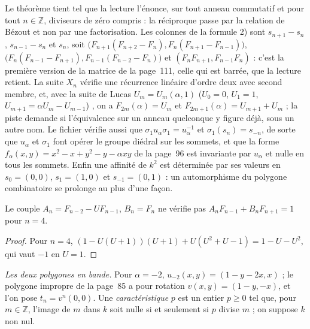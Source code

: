\begin{remarque}
Le théorème tient tel que la lecture l'énonce, sur tout anneau commutatif et pour tout $n \in \mathbb Z$, diviseurs de zéro compris : la réciproque passe par la relation de Bézout et non par une factorisation. Les colonnes de la formule 2) sont $s_{n+1} - s_n$, $s_{n-1} - s_n$ et $s_n$, soit $\bigl(F_{n+1}(F_{n+2} - F_n), F_n(F_{n+1} - F_{n-1})\bigr)$, $\bigl(F_n(F_{n-1} - F_{n+1}), F_{n-1}(F_{n-2} - F_n)\bigr)$ et $(F_n F_{n+1}, F_{n-1} F_n)$ : c'est la première version de la matrice de la page~111, celle qui est barrée, que la lecture retient. La suite $X_n$ vérifie une récurrence linéaire d'ordre deux avec second membre, et, avec la suite de Lucas $U_m = U_m(\alpha, 1)$ ($U_0 = 0$, $U_1 = 1$, $U_{m+1} = \alpha U_m - U_{m-1}$) \cite{lucas1878}, on a $F_{2m}(\alpha) = U_m$ et $F_{2m+1}(\alpha) = U_{m+1} + U_m$ ; la piste demande si l'équivalence sur un anneau quelconque y figure déjà, sous un autre nom. Le fichier vérifie aussi que $\sigma_1 u_\alpha \sigma_1 = u_\alpha^{-1}$ et $\sigma_1(s_n) = s_{-n}$, de sorte que $u_\alpha$ et $\sigma_1$ font opérer le groupe diédral sur les sommets, et que la forme $f_\alpha(x, y) = x^2 - x + y^2 - y - \alpha xy$ de la page~96 est invariante par $u_\alpha$ et nulle en tous les sommets. Enfin une affinité de $k^2$ est déterminée par ses valeurs en $s_0 = (0, 0)$, $s_1 = (1, 0)$ et $s_{-1} = (0, 1)$ : un automorphisme du polygone combinatoire se prolonge au plus d'une façon.
\end{remarque}

\begin{encadre}
\begin{contrexemple}
Le couple $A_n = F_{n-2} - U F_{n-1}$, $B_n = F_n$ ne vérifie pas $A_n F_{n-1} + B_n F_{n+1} = 1$ pour $n = 4$.
\end{contrexemple}
\end{encadre}

\begin{proof}
Pour $n = 4$, $(1 - U(U + 1))(U + 1) + U(U^2 + U - 1) = 1 - U - U^2$, qui vaut $-1$ en $U = 1$.
\end{proof}

\noindent\emph{Les deux polygones en bande.} Pour $\alpha = -2$, $u_{-2}(x, y) = (1 - y - 2x, x)$ ; le polygone impropre de la page~85 a pour rotation $v(x, y) = (1 - y, -x)$, et l'on pose $t_n = v^n(0, 0)$. Une \emph{caractéristique} $p$ est un entier $p \geq 0$ tel que, pour $m \in \mathbb Z$, l'image de $m$ dans $k$ soit nulle si et seulement si $p$ divise $m$ ; on suppose $k$ non nul.


